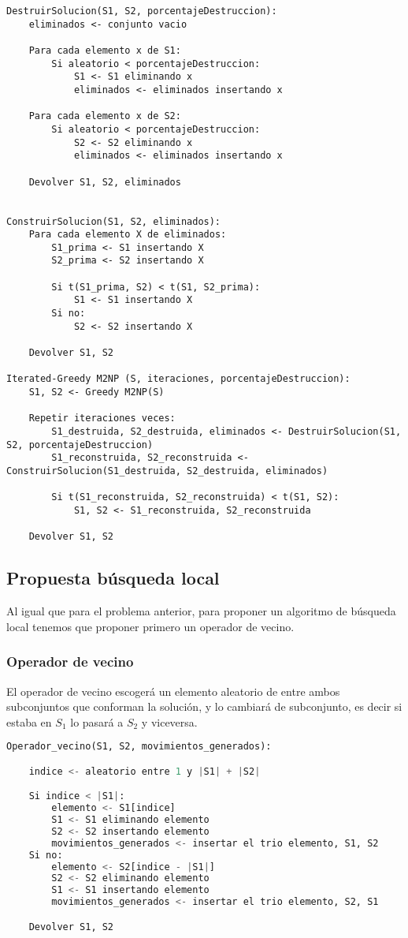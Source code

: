 \begin{lstlisting}
DestruirSolucion(S1, S2, porcentajeDestruccion):
	eliminados <- conjunto vacio

	Para cada elemento x de S1:
		Si aleatorio < porcentajeDestruccion:
			S1 <- S1 eliminando x
			eliminados <- eliminados insertando x

	Para cada elemento x de S2:
		Si aleatorio < porcentajeDestruccion:
			S2 <- S2 eliminando x
			eliminados <- eliminados insertando x

	Devolver S1, S2, eliminados


ConstruirSolucion(S1, S2, eliminados):
	Para cada elemento X de eliminados:
		S1_prima <- S1 insertando X
		S2_prima <- S2 insertando X

		Si t(S1_prima, S2) < t(S1, S2_prima):
			S1 <- S1 insertando X
		Si no:
			S2 <- S2 insertando X

	Devolver S1, S2

Iterated-Greedy M2NP (S, iteraciones, porcentajeDestruccion):
	S1, S2 <- Greedy M2NP(S)

	Repetir iteraciones veces:
		S1_destruida, S2_destruida, eliminados <- DestruirSolucion(S1, S2, porcentajeDestruccion)
		S1_reconstruida, S2_reconstruida <- ConstruirSolucion(S1_destruida, S2_destruida, eliminados)

		Si t(S1_reconstruida, S2_reconstruida) < t(S1, S2):
			S1, S2 <- S1_reconstruida, S2_reconstruida

	Devolver S1, S2
\end{lstlisting}


\subsection{Propuesta búsqueda local}

Al igual que para el problema anterior, para proponer un algoritmo de búsqueda local tenemos que proponer primero un operador de vecino.

\subsubsection{Operador de vecino}

El operador de vecino escogerá un elemento aleatorio de entre ambos subconjuntos que conforman la solución, y lo cambiará de subconjunto, es decir si estaba en $S_1$ lo pasará a $S_2$ y viceversa.

\begin{lstlisting}[language=python]
Operador_vecino(S1, S2, movimientos_generados):

	indice <- aleatorio entre 1 y |S1| + |S2|

	Si indice < |S1|:
		elemento <- S1[indice]
		S1 <- S1 eliminando elemento
		S2 <- S2 insertando elemento
		movimientos_generados <- insertar el trio elemento, S1, S2
	Si no:
		elemento <- S2[indice - |S1|]
		S2 <- S2 eliminando elemento
		S1 <- S1 insertando elemento
		movimientos_generados <- insertar el trio elemento, S2, S1

	Devolver S1, S2
\end{lstlisting}


